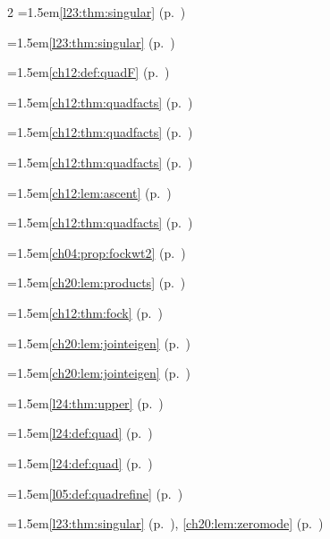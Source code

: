 \begin{multicols}{2}
\hangindent=1.5em\quad \ref{l23:thm:singular} (p.~\pageref{l23:thm:singular})\par
\hangindent=1.5em\quad \ref{l23:thm:singular} (p.~\pageref{l23:thm:singular})\par
\hangindent=1.5em\quad \ref{ch12:def:quadF} (p.~\pageref{ch12:def:quadF})\par
\hangindent=1.5em\quad \ref{ch12:thm:quadfacts} (p.~\pageref{ch12:thm:quadfacts})\par
\hangindent=1.5em\quad \ref{ch12:thm:quadfacts} (p.~\pageref{ch12:thm:quadfacts})\par
\hangindent=1.5em\quad \ref{ch12:thm:quadfacts} (p.~\pageref{ch12:thm:quadfacts})\par
\hangindent=1.5em\quad \ref{ch12:lem:ascent} (p.~\pageref{ch12:lem:ascent})\par
\hangindent=1.5em\quad \ref{ch12:thm:quadfacts} (p.~\pageref{ch12:thm:quadfacts})\par
\hangindent=1.5em\quad \ref{ch04:prop:fockwt2} (p.~\pageref{ch04:prop:fockwt2})\par
\hangindent=1.5em\quad \ref{ch20:lem:products} (p.~\pageref{ch20:lem:products})\par
\hangindent=1.5em\quad \ref{ch12:thm:fock} (p.~\pageref{ch12:thm:fock})\par
\hangindent=1.5em\quad \ref{ch20:lem:jointeigen} (p.~\pageref{ch20:lem:jointeigen})\par
\hangindent=1.5em\quad \ref{ch20:lem:jointeigen} (p.~\pageref{ch20:lem:jointeigen})\par
\hangindent=1.5em\quad \ref{l24:thm:upper} (p.~\pageref{l24:thm:upper})\par
\hangindent=1.5em\quad \ref{l24:def:quad} (p.~\pageref{l24:def:quad})\par
\hangindent=1.5em\quad \ref{l24:def:quad} (p.~\pageref{l24:def:quad})\par
\hangindent=1.5em\quad \ref{l05:def:quadrefine} (p.~\pageref{l05:def:quadrefine})\par
\hangindent=1.5em\quad \ref{l23:thm:singular} (p.~\pageref{l23:thm:singular}), \ref{ch20:lem:zeromode} (p.~\pageref{ch20:lem:zeromode})\par

\end{multicols}
